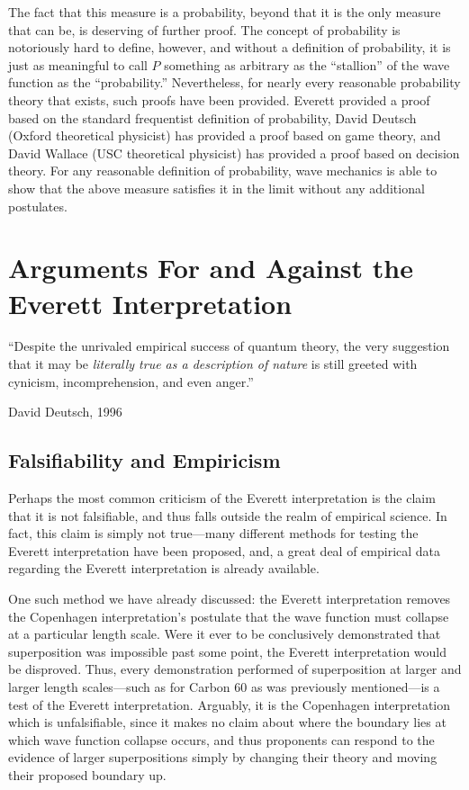 \documentclass[
    12pt,
    letterpaper,
    aps,
    prd,
    longbibliography,
    twocolumn,
    nofootinbib,
    raggedbottom,
    amsmath,
    amssymb,
    amsfonts,
]{revtex4-1}
\begin{document}
The fact that this measure is a probability, beyond that it is the only measure that can be, is deserving of further proof. The concept of probability is notoriously hard to define, however, and without a definition of probability, it is just as meaningful to call $P$ something as arbitrary as the ``stallion'' of the wave function as the ``probability.'' Nevertheless, for nearly every reasonable probability theory that exists, such proofs have been provided. Everett provided a proof based on the standard frequentist definition of probability\cite{everett}\cite{relativestate}, David Deutsch (Oxford theoretical physicist) has provided a proof based on game theory\cite{bornproof1}, and David Wallace (USC theoretical physicist) has provided a proof based on decision theory\cite{bornproof2}. For any reasonable definition of probability, wave mechanics is able to show that the above measure satisfies it in the limit without any additional postulates.\cite{bornproof3}\cite{bornproof2summary}\cite{chris}

\pagebreak

\section{Arguments For and Against the Everett Interpretation}
\label{sec:args}

\epigraph{``Despite the unrivaled empirical success of quantum theory, the very suggestion that it may be \textit{literally true as a description of nature} is still greeted with cynicism, incomprehension, and even anger.''\cite{everetttaboo}}{David Deutsch, 1996}

\subsection{Falsifiability and Empiricism}

Perhaps the most common criticism of the Everett interpretation is the claim that it is not falsifiable, and thus falls outside the realm of empirical science.\cite{carolltestable} In fact, this claim is simply not true---many different methods for testing the Everett interpretation have been proposed, and, a great deal of empirical data regarding the Everett interpretation is already available.

One such method we have already discussed: the Everett interpretation removes the Copenhagen interpretation's postulate that the wave function must collapse at a particular length scale. Were it ever to be conclusively demonstrated that superposition was impossible past some point, the Everett interpretation would be disproved. Thus, every demonstration performed of superposition at larger and larger length scales---such as for Carbon 60 as was previously mentioned\cite{buckyballs}---is a test of the Everett interpretation. Arguably, it is the Copenhagen interpretation which is unfalsifiable, since it makes no claim about where the boundary lies at which wave function collapse occurs, and thus proponents can respond to the evidence of larger superpositions simply by changing their theory and moving their proposed boundary up.
\end{document}
